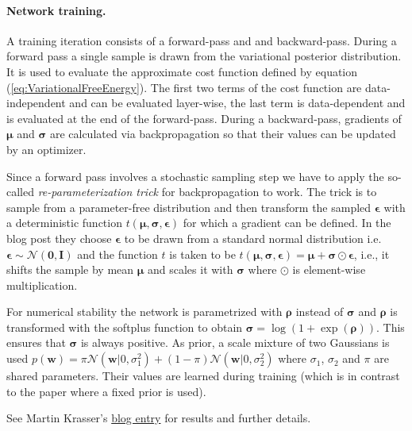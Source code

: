 \documentclass[%
oneside,                 %
final,                   %
10pt]{article}
\begin{document}
\paragraph{Network training.}
A training iteration consists of a forward-pass and and backward-pass. During a forward pass a single sample is drawn from the variational posterior distribution. It is used to evaluate the approximate cost function defined by equation (\ref{eq:VariationalFreeEnergy}). The first two terms of the cost function are data-independent and can be evaluated layer-wise, the last term is data-dependent and is evaluated at the end of the forward-pass. During a backward-pass, gradients of $\boldsymbol{\mu}$ and $\boldsymbol{\sigma}$ are calculated via backpropagation so that their values can be updated by an optimizer.

Since a forward pass involves a stochastic sampling step we have to apply the so-called \emph{re-parameterization trick} for backpropagation to work. The trick is to sample from a parameter-free distribution and then transform the sampled $\boldsymbol{\epsilon}$ with a deterministic function $t(\boldsymbol{\mu}, \boldsymbol{\sigma}, \boldsymbol{\epsilon})$ for which a gradient can be defined. In the blog post they choose $\boldsymbol{\epsilon}$ to be drawn from a standard normal distribution i.e.~$\boldsymbol{\epsilon} \sim \mathcal{N}(\boldsymbol{0}, \boldsymbol{I})$ and the function $t$ is taken to be $t(\boldsymbol{\mu}, \boldsymbol{\sigma}, \boldsymbol{\epsilon}) = \boldsymbol{\mu} + \boldsymbol{\sigma} \odot \boldsymbol{\epsilon}$, i.e., it shifts the sample by mean $\boldsymbol{\mu}$ and scales it with $\boldsymbol{\sigma}$ where $\odot$ is element-wise multiplication.

For numerical stability the network is parametrized with $\boldsymbol{\rho}$ instead of $\boldsymbol{\sigma}$ and $\boldsymbol{\rho}$ is transformed with the softplus function to obtain $\boldsymbol{\sigma} = \log(1 + \exp(\boldsymbol{\rho}))$. This ensures that $\boldsymbol{\sigma}$ is always positive. As prior, a scale mixture of two Gaussians is used $p(\boldsymbol{w}) = \pi \mathcal{N}(\boldsymbol{w} \lvert 0,\sigma_1^2) + (1 - \pi) \mathcal{N}(\boldsymbol{w} \lvert 0,\sigma_2^2)$ where $\sigma_1$, $\sigma_2$ and $\pi$ are shared parameters. Their values are learned during training (which is in contrast to the paper where a fixed prior is used).

See Martin Krasser's \href{{http://krasserm.github.io/2019/03/14/bayesian-neural-networks/}}{blog entry} for results and further details.


\end{document}
